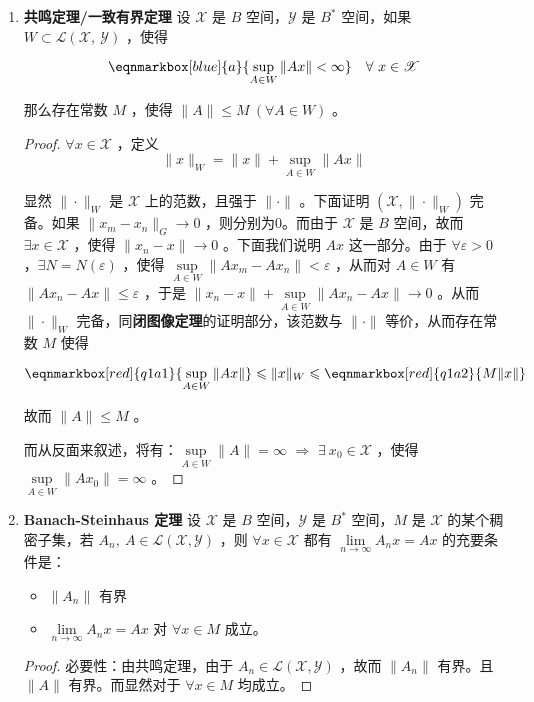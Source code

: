 \begin{enumerate}[leftmargin=2cm, label=\arabic*]
\begin{proof}
			即我们的目的说明了 $T$ 是有界算子，故而 $T$ 是连续的。
		\end{proof}
		\item \textbf{共鸣定理/一致有界定理} 设 $\mathscr{X}$ 是 $B$ 空间，$\mathscr{Y}$ 是 $B^*$ 空间，如果 $W\subset\mathscr{L}(\mathscr{X},\ \mathscr{Y})$ ，使得
		
		\begin{equation}
			\eqnmarkbox[blue]{a}{\sup\limits_{A\in W} \|Ax\| < \infty} \quad \forall\ x\in \mathscr{X} \nonumber
		\end{equation}
		
		那么存在常数 $M$ ，使得 $\|A\|\leqslant M\ (\forall A\in W)$ 。
		\begin{proof}
			$\forall x\in\mathscr{X}$ ，定义
			\begin{equation*}
				\|x\|_W = \|x\| + \sup\limits_{A\in W} \|Ax\|
			\end{equation*}
			
			显然 $\|\cdot\|_W$ 是 $\mathscr{X}$ 上的范数，且强于 $\|\cdot\|$ 。下面证明 $(\mathscr{X},\|\cdot\|_W)$ 完备。如果 $\|x_m - x_n\|_G\to 0$ ，则分别为0。而由于 $\mathscr{X}$ 是 $B$ 空间，故而 $\exists x\in\mathscr{X}$ ，使得 $\|x_n - x\|\to 0$ 。下面我们说明 $Ax$ 这一部分。由于 $\forall\varepsilon > 0$ ，$\exists N= N(\varepsilon)$ ，使得 $\sup\limits_{A\in W} \|Ax_m - Ax_n\| < \varepsilon$ ，从而对 $A\in W$ 有 $\|Ax_n - Ax\|\leqslant \varepsilon$ ，于是 $\|x_n - x\| + \sup\limits_{A\in W}\|Ax_n - Ax\| \to 0$ 。从而 $\|\cdot\|_W$ 完备，同\textbf{闭图像定理}的证明部分，该范数与 $\|\cdot\|$ 等价，从而存在常数 $M$ 使得
			
			\begin{equation*}
				\eqnmarkbox[red]{q1a1}{\sup\limits_{A\in W}\|Ax\|} \leqslant \|x\|_W \leqslant \eqnmarkbox[red]{q1a2}{M\|x\|}
			\end{equation*}
			
			故而 $\|A\| \leqslant M$ 。
			
			而从反面来叙述，将有：$\sup\limits_{A\in W} \|A\| =\infty$ $\Longrightarrow$ $\exists\ x_0\in\mathscr{X}$ ，使得 $\sup\limits_{A\in W} \|Ax_0\| = \infty$ 。
		\end{proof}
		\item \textbf{Banach-Steinhaus 定理} 设 $\mathscr{X}$ 是 $B$ 空间，$\mathscr{Y}$ 是 $B^*$ 空间，$M$ 是 $\mathscr{X}$ 的某个稠密子集，若 $A_n,\ A\in\mathscr{L}(\mathscr{X},\mathscr{Y})$ ，则 $\forall x\in\mathscr{X}$ 都有 $\lim\limits_{n\to\infty} A_n x = Ax$ 的充要条件是：
		\begin{itemize}
			\item $\|A_n\|$ 有界
			\item $\lim\limits_{n\to\infty} A_n x = Ax$ 对 $\forall x\in M$ 成立。
		\end{itemize}
		\begin{proof}
			必要性：由共鸣定理，由于 $A_n\in\mathscr{L}(\mathscr{X},\mathscr{Y})$ ，故而 $\|A_n\|$ 有界。且 $\|A\|$ 有界。而显然对于 $\forall x\in M$ 均成立。
			

\end{proof}
\end{enumerate}
